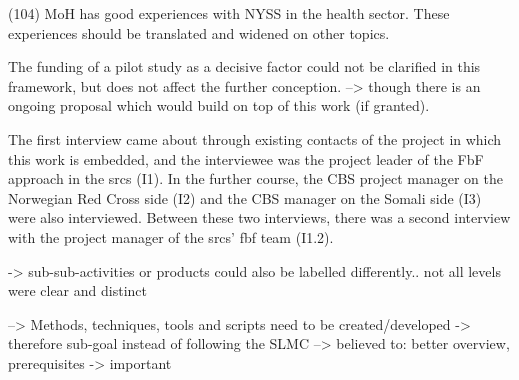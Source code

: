(104) MoH has good experiences with NYSS in the health sector. These experiences should be translated and widened on other topics.

The funding of a pilot study as a decisive factor could not be clarified in this framework, but does not affect the further conception. --> though there is an ongoing proposal which would build on top of this work (if granted).

The first interview came about through existing contacts of the project in which this work is embedded, and the interviewee was the project leader of the FbF approach in the \acrshort{srcs} (I1). In the further course, the CBS project manager on the Norwegian Red Cross side (I2) and the CBS manager on the Somali side (I3) were also interviewed. Between these two interviews, there was a second interview with the project manager of the \acrshort{srcs}' \acrshort{fbf} team (I1.2).


-> sub-sub-activities or products could also be labelled differently.. not all levels were clear and distinct

--> Methods, techniques, tools and scripts need to be created/developed -> therefore sub-goal instead of following the SLMC --> believed to: better overview, prerequisites -> important







